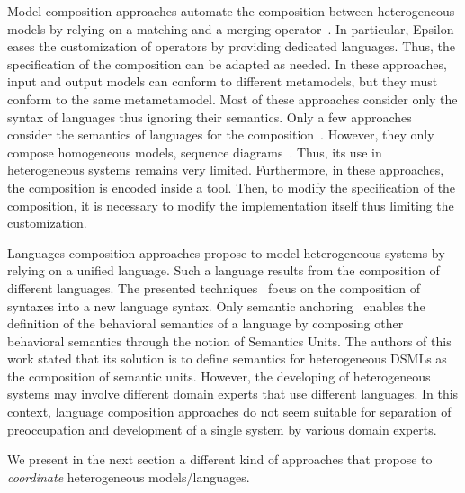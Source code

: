 Model composition approaches automate the composition between heterogeneous models by relying on a matching and a merging operator~\cite{mergemanifest,epsilon,kompose}. In particular, Epsilon~\cite{epsilon} eases the customization of operators by providing dedicated languages. Thus, the specification of the composition can be adapted as needed. In these approaches, input and output models can conform to different metamodels, but they must conform to the same metametamodel. Most of these approaches consider only the syntax of languages thus ignoring their semantics. Only a few approaches consider the semantics of languages for the composition~\cite{sequenceweavingbib,rambib,composdbib}. However, they only compose homogeneous models, \eg sequence diagrams~\cite{rambib}. Thus, its use in heterogeneous systems remains very limited. Furthermore, in these approaches, the composition is encoded inside a tool. Then, to modify the specification of the composition, it is necessary to modify the implementation itself thus limiting the customization. 

Languages composition approaches propose to model heterogeneous systems by relying on a unified language. Such a language results from the composition of different languages. The presented techniques~\cite{metamodelcompo} focus on the composition of syntaxes into a new language syntax. Only semantic anchoring~\cite{semanticsanchoring} enables the definition of the behavioral semantics of a language by composing other behavioral semantics through the notion of Semantics Units. The authors of this work stated that its solution is to define semantics for heterogeneous DSMLs as the composition of semantic units. However, the developing of heterogeneous systems may involve different domain experts that use different languages. In this context, language composition approaches do not seem suitable for separation of preoccupation and development of a single system by various domain experts.

We present in the next section a different kind of approaches that propose to \emph{coordinate} heterogeneous models/languages. 



